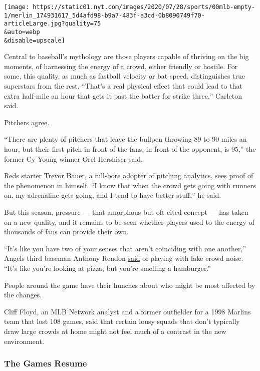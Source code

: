 \texttt{[image: https://static01.nyt.com/images/2020/07/28/sports/00mlb-empty-1/merlin\_174931617\_5d4afd98-b9a7-483f-a3cd-0b8090749f70-articleLarge.jpg?quality=75\\\&auto=webp\\\&disable=upscale]}

Central to baseball's mythology are those players capable of thriving on
the big moments, of harnessing the energy of a crowd, either friendly or
hostile. For some, this quality, as much as fastball velocity or bat
speed, distinguishes true superstars from the rest. ``That's a real
physical effect that could lead to that extra half-mile an hour that
gets it past the batter for strike three,'' Carleton said.

Pitchers agree.

``There are plenty of pitchers that leave the bullpen throwing 89 to 90
miles an hour, but their first pitch in front of the fans, in front of
the opponent, is 95,'' the former Cy Young winner Orel Hershiser said.

Reds starter Trevor Bauer, a full-bore adopter of pitching analytics,
sees proof of the phenomenon in himself. ``I know that when the crowd
gets going with runners on, my adrenaline gets going, and I tend to have
better stuff,'' he said.

But this season, pressure --- that amorphous but oft-cited concept ---
has taken on a new quality, and it remains to be seen whether players
used to the energy of thousands of fans can provide their own.

``It's like you have two of your senses that aren't coinciding with one
another,'' Angels third baseman Anthony Rendon
\href{https://www.espn.com/mlb/story/_/id/29436493/angels-anthony-rendon-wants-music-dumb-piped-fan-noise}{said}
of playing with fake crowd noise. ``It's like you're looking at pizza,
but you're smelling a hamburger.''

People around the game have their hunches about who might be most
affected by the changes.

Cliff Floyd, an MLB Network analyst and a former outfielder for a 1998
Marlins team that lost 108 games, said that certain lousy squads that
don't typically draw large crowds at home might not feel much of a
contrast in the new environment.

\hypertarget{the-games-resume}{%
\subsubsection{The Games Resume}\label{the-games-resume}}

